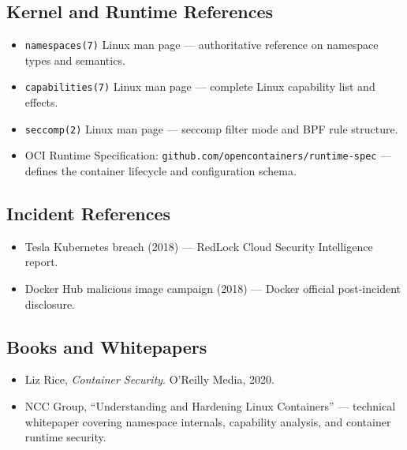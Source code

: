 \subsection*{Kernel and Runtime References}
\begin{itemize}
    \item \texttt{namespaces(7)} Linux man page --- authoritative reference on namespace types and semantics.
    \item \texttt{capabilities(7)} Linux man page --- complete Linux capability list and effects.
    \item \texttt{seccomp(2)} Linux man page --- seccomp filter mode and BPF rule structure.
    \item OCI Runtime Specification: \texttt{github.com/opencontainers/runtime-spec} --- defines the container lifecycle and configuration schema.
\end{itemize}

\subsection*{Incident References}
\begin{itemize}
    \item Tesla Kubernetes breach (2018) --- RedLock Cloud Security Intelligence report.
    \item Docker Hub malicious image campaign (2018) --- Docker official post-incident disclosure.
\end{itemize}

\subsection*{Books and Whitepapers}
\begin{itemize}
    \item Liz Rice, \textit{Container Security}. O'Reilly Media, 2020.
    \item NCC Group, ``Understanding and Hardening Linux Containers'' --- technical whitepaper covering namespace internals, capability analysis, and container runtime security.
\end{itemize}